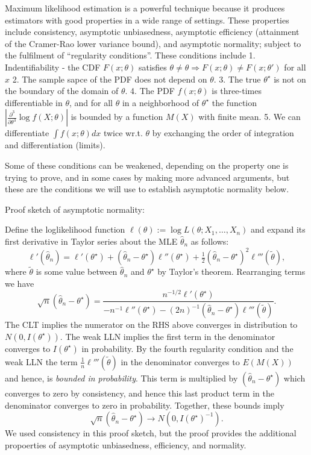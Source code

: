 \documentclass[
]{book}
\begin{document}
Maximum likelihood estimation is a powerful technique because it produces estimators with good properties in a wide range of settings. These properties include consistency, asymptotic unbiasedness, asymptotic efficiency (attainment of the Cramer-Rao lower variance bound), and asymptotic normality; subject to the fulfilment of ``regularity conditions''. These conditions include
1. Indentifiability - the CDF \(F(x; \theta)\) satisfies \(\theta\ne\theta\Rightarrow F(x;\theta)\ne F(x;\theta')\) for all \(x\)
2. The sample sapce of the PDF does not depend on \(\theta\).
3. The true \(\theta^\star\) is not on the boundary of the domain of \(\theta\).
4. The PDF \(f(x;\theta)\) is three-times differentiable in \(\theta\), and for all \(\theta\) in a neighborhood of \(\theta^\star\) the function \(|\frac{\partial^3}{\partial\theta^3}\log f(X;\theta)|\) is bounded by a function \(M(X)\) with finite mean.
5. We can differentiate \(\int f(x;\theta)dx\) twice wr.t. \(\theta\) by exchanging the order of integration and differentiation (limits).

Some of these conditions can be weakened, depending on the property one is trying to prove, and in some cases by making more advanced arguments, but these are the conditions we will use to establish asymptotic normality below.

Proof sketch of asymptotic normality:

Define the loglikelihood function \(\ell(\theta):=\log L(\theta;X_1, \ldots, X_n)\) and expand its first derivative in Taylor series about the MLE \(\hat\theta_n\) as follows:
\[\ell'(\hat\theta_n) = \ell'(\theta^\star) + (\hat\theta_n - \theta^\star)\ell''(\theta^\star) + \tfrac12(\hat\theta_n - \theta^\star)^2\ell'''(\tilde\theta),\]
where \(\tilde\theta\) is some value between \(\hat\theta_n\) and \(\theta^\star\) by Taylor's theorem. Rearranging terms we have
\[\sqrt{n}(\hat\theta_n - \theta^\star) = \frac{n^{-1/2}\ell'(\theta^\star)}{-n^{-1}\ell''(\theta^\star) - (2n)^{-1}(\hat\theta_n-\theta^\star)\ell'''(\tilde\theta)}.\]
The CLT implies the numerator on the RHS above converges in distribution to \(N(0, I(\theta^\star))\). The weak LLN implies the first term in the denominator converges to \(I(\theta^\star)\) in probability. By the fourth regularity condition and the weak LLN the term \(\tfrac1n \ell'''(\tilde\theta)\) in the denominator converges to \(E(M(X))\) and hence, is \emph{bounded in probability}. This term is multiplied by \((\hat\theta_n - \theta^\star)\) which converges to zero by consistency, and hence this last product term in the denominator converges to zero in probability. Together, these bounds imply
\[\sqrt{n}(\hat\theta_n - \theta^\star)\rightarrow N(0,I(\theta^\star)^{-1}).\]
We used consistency in this proof sketch, but the proof provides the additional propoerties of asymptotic unbiasedness, efficiency, and normality.

  
\end{document}
